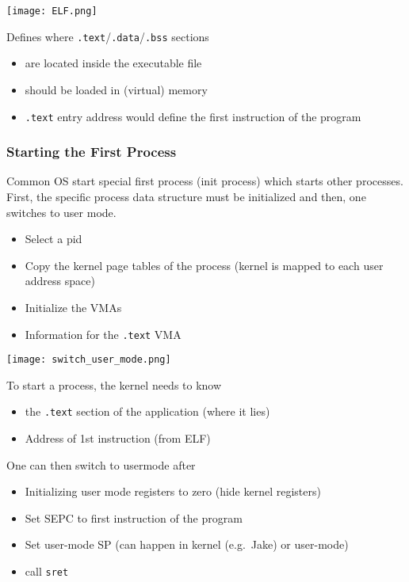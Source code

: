 \begin{center}
    \texttt{[image: ELF.png]}
\end{center}
Defines where \texttt{.text}/\texttt{.data}/\texttt{.bss} sections
\begin{itemize}
    \item are located inside the executable file
    \item should be loaded in (virtual) memory
    \item \texttt{.text} entry address would define the first instruction of the program
\end{itemize} 

\subsubsection{Starting the First Process}
Common OS start special first process (init process) which starts other processes. First, the specific process data structure must be initialized and then, one switches to user mode.
\begin{itemize}
    \item Select a pid
    \item Copy the kernel page tables of the process (kernel is mapped to each user address space)
    \item Initialize the VMAs
    \item Information for the \texttt{.text} VMA
\end{itemize}

\begin{center}
    \texttt{[image: switch\_user\_mode.png]}
\end{center}
To start a process, the kernel needs to know
\begin{itemize}
    \item the \texttt{.text} section of the application (where it lies)
    \item Address of 1st instruction (from ELF)
\end{itemize}
One can then switch to usermode after
\begin{itemize}
    \item Initializing user mode registers to zero (hide kernel registers)
    \item Set SEPC to first instruction of the program
    \item Set user-mode SP (can happen in kernel (e.g.\ Jake) or user-mode)
    \item call \texttt{sret}
\end{itemize}

